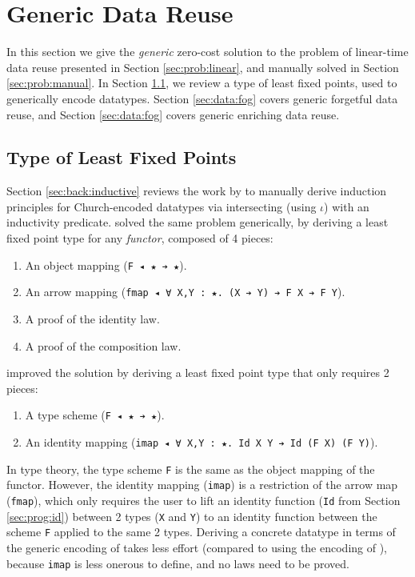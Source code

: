 \documentclass[acmsmall]{acmart}\settopmatter{}
\newcommand{\refsec}[1]{Section \ref{sec:#1}}
\newcommand{\labsec}[1]{\label{sec:#1}}
\begin{document}
\section{Generic Data Reuse}
\labsec{data}

In this section we give the \textit{generic} zero-cost solution to the problem of
linear-time data reuse presented in \refsec{prob:linear}, and manually
solved in \refsec{prob:manual}. In \refsec{data:fix}, we review a
type of least fixed points, used to generically encode datatypes.
\refsec{data:fog} covers generic forgetful data reuse, and
\refsec{data:fog} covers generic enriching data reuse.

\subsection{Type of Least Fixed Points}
\labsec{data:fix}

\refsec{back:inductive} reviews the work by \citet{stump18} to
manually derive induction principles for Church-encoded datatypes via
intersecting (using $\iota$) with an inductivity predicate.
\citet{firsov18a} solved the same problem generically, by deriving a
least fixed point type for any \textit{functor}, composed of 4 pieces:
\begin{enumerate}
\item An object mapping (\verb;F ◂ ★ ➔ ★;).
\item An arrow mapping
  (\verb;fmap ◂ ∀ X,Y : ★. (X ➔ Y) ➔ F X ➔ F Y;).
\item A proof of the identity law.
\item A proof of the composition law.
\end{enumerate}

\citet{firsov18b} improved the solution by deriving a
least fixed point type that only requires 2 pieces:
\begin{enumerate}
\item A type scheme (\verb;F ◂ ★ ➔ ★;).
\item An identity mapping
  (\verb;imap ◂ ∀ X,Y : ★. Id X Y ➔ Id (F X) (F Y);).
\end{enumerate}

In type theory, the type scheme \verb;F; is the same as the object
mapping of the functor. However, the identity mapping (\verb;imap;) is
a restriction of the arrow map (\verb;fmap;), which only requires the
user to lift an identity function
(\verb;Id; from \refsec{prog:id}) between 2 types
(\verb;X; and \verb;Y;) to an identity function
between the scheme \verb;F; applied to the same 2 types.
Deriving a concrete datatype in terms of the generic encoding of
\citet{firsov18b} takes less effort (compared to using the encoding of
\citet{firsov18a}), because \verb;imap; is less onerous to define, and no
laws need to be proved.
\end{document}
